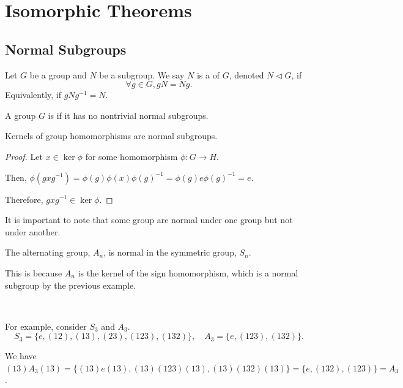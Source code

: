 \chapter{Isomorphic Theorems}

\section{Normal Subgroups}

\begin{definition}\label{def:normal-subgroup}
    Let $G$ be a group and $N$ be a subgroup. We say $N$ is a  of $G$, denoted $N \triangleleft G$, if \[
        \forall g \in G, gN = Ng.
    \] Equivalently, if $gNg^{-1} = N$.
\end{definition}

\begin{definition}\label{def:simple-group}
    A group $G$ is  if it has no nontrivial normal subgroups.
\end{definition}

\begin{example}
    Kernels of group homomorphisms are normal subgroups.

    \begin{proof}
        Let $x \in \ker{\phi}$ for some homomorphism $\phi: G \to H$.

        Then, $\phi(gxg^{-1}) = \phi(g)\phi(x)\phi(g)^{-1} = \phi(g)e\phi(g)^{-1} = e$.

        Therefore, $gxg^{-1} \in \ker{\phi}$.
    \end{proof}
\end{example}

It is important to note that some group are normal under one group but not under another.

\begin{example}
    The alternating group, $A_n$, is normal in the symmetric group, $S_n$.

    This is because $A_n$ is the kernel of the sign homomorphism, which is a normal subgroup by the previous example.

    {~~~}

    For example, consider $S_3$ and $A_3$. \[
        S_3 = \{e, (12), (13), (23), (123), (132)\}, \quad A_3 = \{e, (123), (132)\}.
    \]

    We have $(13)A_3(13) = \{
        (13)e(13), (13)(123)(13), (13)(132)(13)
        \} = \{
        e, (132), (123)
    \} = A_3$.
\end{example}

